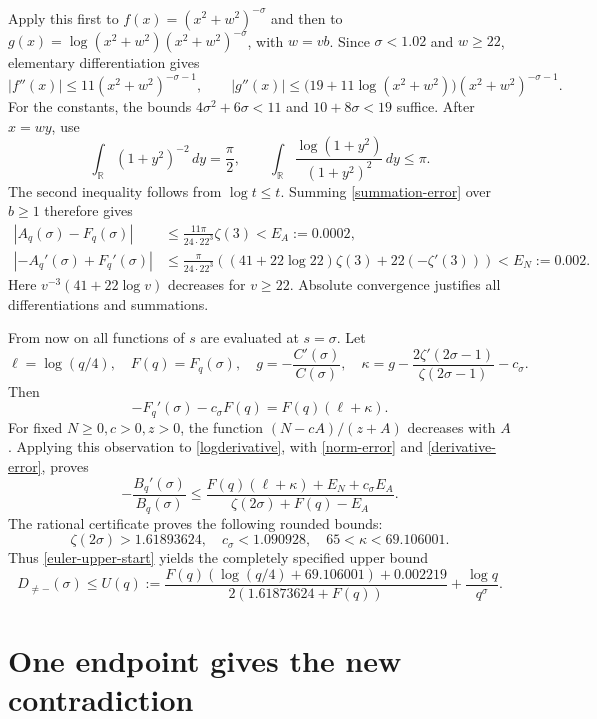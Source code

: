 \documentclass[11pt]{article}
\begin{document}
Apply this first to \(f(x)=(x^2+w^2)^{-\sigma}\) and then to
\(g(x)=\log(x^2+w^2)(x^2+w^2)^{-\sigma}\), with \(w=vb\).
Since \(\sigma<1.02\) and \(w\ge22\), elementary differentiation gives
\[
 |f''(x)|\le11(x^2+w^2)^{-\sigma-1},\qquad
 |g''(x)|\le\bigl(19+11\log(x^2+w^2)\bigr)
                         (x^2+w^2)^{-\sigma-1}.
\]
For the constants, the bounds
\(4\sigma^2+6\sigma<11\) and \(10+8\sigma<19\) suffice.
After \(x=wy\), use
\[
 \int_{\mathbb R}(1+y^2)^{-2}\,dy=\frac\pi2,\qquad
 \int_{\mathbb R}\frac{\log(1+y^2)}{(1+y^2)^2}\,dy\le\pi.
\]
The second inequality follows from \(\log t\le t\).
Summing \eqref{summation-error} over \(b\ge1\) therefore gives
\begin{align}
 |A_q(\sigma)-F_q(\sigma)|
 &\le \frac{11\pi}{24\cdot22^3}\zeta(3)
 <E_A:=0.0002,\label{norm-error}\\
 |-A_q'(\sigma)+F_q'(\sigma)|
 &\le\frac{\pi}{24\cdot22^3}
 \left((41+22\log22)\zeta(3)+22(-\zeta'(3))\right)
 <E_N:=0.002.\label{derivative-error}
\end{align}
Here \(v^{-3}(41+22\log v)\) decreases for \(v\ge22\).
Absolute convergence justifies all differentiations and summations.

From now on all functions of \(s\) are evaluated at \(s=\sigma\).
Let
\[
 \ell=\log(q/4),\quad F(q)=F_q(\sigma),\quad
 g=-\frac{C'(\sigma)}{C(\sigma)},\quad
 \kappa=g-\frac{2\zeta'(2\sigma-1)}{\zeta(2\sigma-1)}-c_\sigma .
\]
Then
\[
 -F_q'(\sigma)-c_\sigma F(q)=F(q)(\ell+\kappa).
\]
For fixed \(N\ge0,c>0,z>0\), the function
\((N-cA)/(z+A)\) decreases with \(A\). Applying this observation
to \eqref{logderivative}, with \eqref{norm-error} and
\eqref{derivative-error}, proves
\[
 -\frac{B_q'(\sigma)}{B_q(\sigma)}
 \le\frac{F(q)(\ell+\kappa)+E_N+c_\sigma E_A}
           {\zeta(2\sigma)+F(q)-E_A}.
\]
The rational certificate proves the following rounded bounds:
\[
 \zeta(2\sigma)>1.61893624,\quad
 c_\sigma<1.090928,\quad
 65<\kappa<69.106001.
\]
Thus \eqref{euler-upper-start} yields the completely specified upper
bound
\begin{equation}\label{euler-upper}
 D_{\ne-}(\sigma)\le U(q):=
 \frac{F(q)(\log(q/4)+69.106001)+0.002219}
      {2(1.61873624+F(q))}
 +\frac{\log q}{q^\sigma}.
\end{equation}

\section{One endpoint gives the new contradiction}\label{endpoint}
\end{document}
